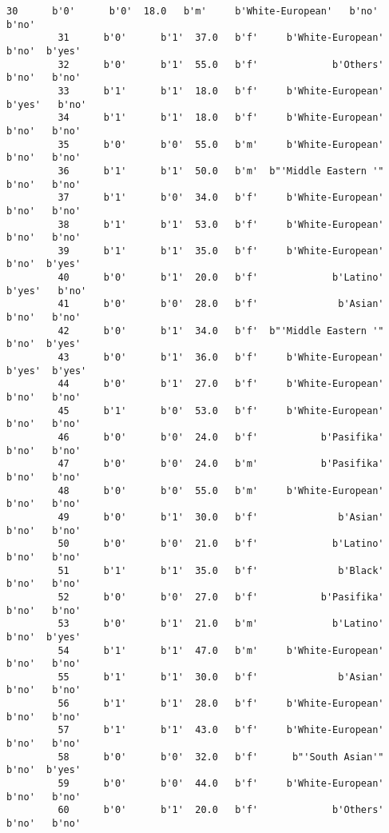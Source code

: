 \documentclass[11pt]{article}
\begin{document}
\begin{Verbatim}[commandchars=\\\{\}]
         30      b'0'      b'0'  18.0   b'm'     b'White-European'   b'no'   b'no'   
         31      b'0'      b'1'  37.0   b'f'     b'White-European'   b'no'  b'yes'   
         32      b'0'      b'1'  55.0   b'f'             b'Others'   b'no'   b'no'   
         33      b'1'      b'1'  18.0   b'f'     b'White-European'  b'yes'   b'no'   
         34      b'1'      b'1'  18.0   b'f'     b'White-European'   b'no'   b'no'   
         35      b'0'      b'0'  55.0   b'm'     b'White-European'   b'no'   b'no'   
         36      b'1'      b'1'  50.0   b'm'  b"'Middle Eastern '"   b'no'   b'no'   
         37      b'1'      b'0'  34.0   b'f'     b'White-European'   b'no'   b'no'   
         38      b'1'      b'1'  53.0   b'f'     b'White-European'   b'no'   b'no'   
         39      b'1'      b'1'  35.0   b'f'     b'White-European'   b'no'  b'yes'   
         40      b'0'      b'1'  20.0   b'f'             b'Latino'  b'yes'   b'no'   
         41      b'0'      b'0'  28.0   b'f'              b'Asian'   b'no'   b'no'   
         42      b'0'      b'1'  34.0   b'f'  b"'Middle Eastern '"   b'no'  b'yes'   
         43      b'0'      b'1'  36.0   b'f'     b'White-European'  b'yes'  b'yes'   
         44      b'0'      b'1'  27.0   b'f'     b'White-European'   b'no'   b'no'   
         45      b'1'      b'0'  53.0   b'f'     b'White-European'   b'no'   b'no'   
         46      b'0'      b'0'  24.0   b'f'           b'Pasifika'   b'no'   b'no'   
         47      b'0'      b'0'  24.0   b'm'           b'Pasifika'   b'no'   b'no'   
         48      b'0'      b'0'  55.0   b'm'     b'White-European'   b'no'   b'no'   
         49      b'0'      b'1'  30.0   b'f'              b'Asian'   b'no'   b'no'   
         50      b'0'      b'0'  21.0   b'f'             b'Latino'   b'no'   b'no'   
         51      b'1'      b'1'  35.0   b'f'              b'Black'   b'no'   b'no'   
         52      b'0'      b'0'  27.0   b'f'           b'Pasifika'   b'no'   b'no'   
         53      b'0'      b'1'  21.0   b'm'             b'Latino'   b'no'  b'yes'   
         54      b'1'      b'1'  47.0   b'm'     b'White-European'   b'no'   b'no'   
         55      b'1'      b'1'  30.0   b'f'              b'Asian'   b'no'   b'no'   
         56      b'1'      b'1'  28.0   b'f'     b'White-European'   b'no'   b'no'   
         57      b'1'      b'1'  43.0   b'f'     b'White-European'   b'no'   b'no'   
         58      b'0'      b'0'  32.0   b'f'      b"'South Asian'"   b'no'  b'yes'   
         59      b'0'      b'0'  44.0   b'f'     b'White-European'   b'no'   b'no'   
         60      b'0'      b'1'  20.0   b'f'             b'Others'   b'no'   b'no'   

\end{Verbatim}
\end{document}
